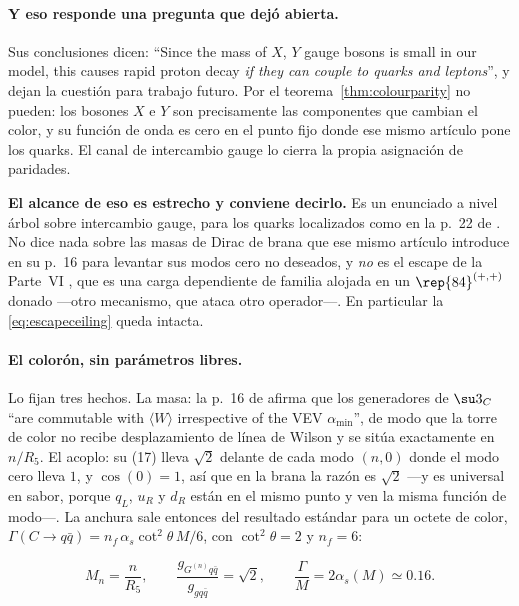 \paragraph{Y eso responde una pregunta que \cite{KM25} dejó abierta.} Sus conclusiones dicen:
``Since the mass of $X$, $Y$ gauge bosons is small in our model, this causes rapid proton decay
\emph{if they can couple to quarks and leptons}'', y dejan la cuestión para trabajo futuro. Por el
teorema~\ref{thm:colourparity} no pueden: los bosones $X$ e $Y$ son precisamente las componentes
que cambian el color, y su función de onda es cero en el punto fijo donde ese mismo artículo pone
los quarks. El canal de intercambio gauge lo cierra la propia asignación de paridades.

\noindent\textbf{El alcance de eso es estrecho y conviene decirlo.} Es un enunciado a nivel árbol
sobre intercambio gauge, para los quarks localizados como en la p.~22 de \cite{KM25}. No dice nada
sobre las masas de Dirac de brana que ese mismo artículo introduce en su p.~16 para levantar sus
modos cero no deseados, y \emph{no} es el escape de la Parte~VI \cite{PartVI}, que es una carga
dependiente de familia alojada en un $\rep{84}^{(+,+)}$ donado ---otro mecanismo, que ataca otro
operador---. En particular la \eqref{eq:escapeceiling} queda intacta.

\paragraph{El colorón, sin parámetros libres.} Lo fijan tres hechos. La masa: la p.~16 de
\cite{KM25} afirma que los generadores de $\su3_C$ ``are commutable with $\langle W\rangle$
irrespective of the VEV $\alpha_{\min}$'', de modo que la torre de color no recibe desplazamiento
de línea de Wilson y se sitúa exactamente en $n/R_5$. El acoplo: su (17) lleva $\sqrt2$ delante de
cada modo $(n,0)$ donde el modo cero lleva $1$, y $\cos(0)=1$, así que en la brana la razón es
$\sqrt2$ ---y es universal en sabor, porque $q_L$, $u_R$ y $d_R$ están en el mismo punto y ven la
misma función de modo---. La anchura sale entonces del resultado estándar para un octete de color,
$\Gamma(C\to q\bar q)=n_f\,\alpha_s\cot^2\theta\,M/6$, con $\cot^2\theta=2$ y $n_f=6$:

\begin{keyeq}
\begin{equation}\label{eq:coloron}
  M_n=\frac{n}{R_5},
  \qquad
  \frac{g_{G^{(n)}q\bar q}}{g_{gq\bar q}}=\sqrt2,
  \qquad
  \frac{\Gamma}{M}=2\alpha_s(M)\simeq0.16 .
\end{equation}
\end{keyeq}

